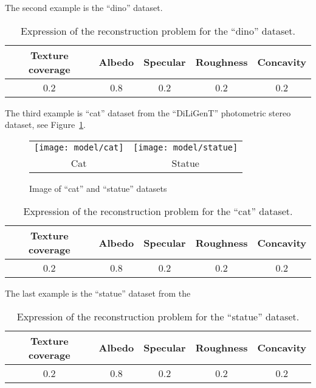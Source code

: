 The second example is the ``dino'' dataset.
\begin{table}[h]
  \centering
  \begin{tabular}{*{5}{c}}
  \hline
  Texture coverage & Albedo & Specular & Roughness & Concavity\\
  \hline
  0.2 & 0.8 & 0.2 & 0.2 & 0.2\\
  \hline
  \end{tabular}
  \label{tab:exp_dino}
  \caption{Expression of the reconstruction problem for the ``dino'' dataset.}
\end{table}

The third example is ``cat'' dataset from the ``DiLiGenT'' photometric stereo dataset, see Figure~\ref{fig:cat_statue}.
\begin{figure}[h!]
\centering
\begin{tabular}{cc}
\texttt{[image: model/cat]}&
\texttt{[image: model/statue]}\\
Cat & Statue\\
\end{tabular}
\caption{Image of ``cat'' and ``statue'' datasets}
\label{fig:cat_statue}
\end{figure}

\begin{table}[h]
  \centering
  \begin{tabular}{*{5}{c}}
  \hline
  Texture coverage & Albedo & Specular & Roughness & Concavity\\
  \hline
  0.2 & 0.8 & 0.2 & 0.2 & 0.2\\
  \hline
  \end{tabular}
  \label{tab:exp_cat}
  \caption{Expression of the reconstruction problem for the ``cat'' dataset.}
\end{table}

The last example is the ``statue'' dataset from the 
\begin{table}[h]
  \centering
  \begin{tabular}{*{5}{c}}
  \hline
  Texture coverage & Albedo & Specular & Roughness & Concavity\\
  \hline
  0.2 & 0.8 & 0.2 & 0.2 & 0.2\\
  \hline
  \end{tabular}
  \label{tab:exp_statue}
  \caption{Expression of the reconstruction problem for the ``statue'' dataset.}
\end{table}